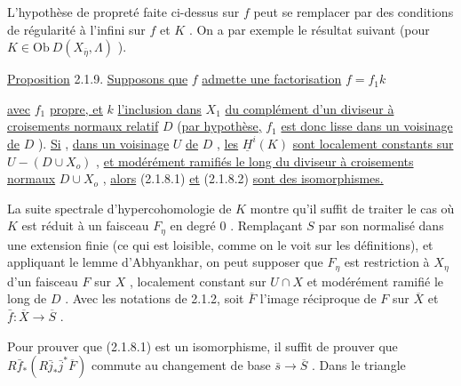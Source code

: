 L'hypothèse de propreté faite ci-dessus sur $f$ peut se remplacer par des conditions de régularité à l'infini sur $f$ et $K$ . On a par exemple le résultat suivant (pour $K \in \mathrm{Ob}\ D(X_{\bar\eta}, \Lambda)$ ).

\underline{Proposition} 2.1.9. \underline{Supposons que} $f$ \underline{admette une factorisation} $f = f_1k$

\begin{center}
\end{center}
\underline{avec} $f_1$ \underline{propre, et} $k$ \underline{l'inclusion dans} $X_1$ \underline{du complément d'un diviseur à croisements normaux relatif} $D$ (\underline{par hypothèse,} $f_1$ \underline{est donc lisse dans un voisinage de} $D$ ). \underline{Si} , \underline{dans un voisinage} $U$ \underline{de} $D$ , \underline{les} $\underline{H}^i(K)$ \underline{sont localement constants sur} $U-(D \cup X_o)$ , \underline{et modérément ramifiés le long du diviseur à croisements normaux} $D \cup X_o$ , \underline{alors} (2.1.8.1) \underline{et} (2.1.8.2) \underline{sont des isomorphismes.}

La suite spectrale d'hypercohomologie de $K$ montre qu'il suffit de traiter le cas où $K$ est réduit à un faisceau $F_\eta$ en degré $0$ . Remplaçant $S$ par son normalisé dans une extension finie (ce qui est loisible, comme on le voit sur les définitions), et appliquant le lemme d'Abhyankhar, on peut supposer que $F_\eta$ est restriction à $X_\eta$ d'un faisceau $F$ sur $X$ , localement constant sur $U \cap X$ et modérément ramifié le long de $D$ . Avec les notations de 2.1.2, soit $\overline{F}$ l'image réciproque de $F$ sur $\overline{X}$ et $\bar f : \overline{X} \to \overline{S}$ .

Pour prouver que (2.1.8.1) est un isomorphisme, il suffit de prouver que $R\bar f_* (R\bar j_* \bar j^* \overline{F})$ commute au changement de base $\bar s \to \overline{S}$ . Dans le triangle

